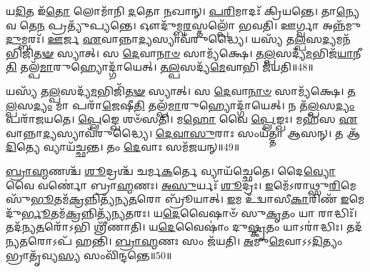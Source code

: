 𑌯\-\ul{𑌦𑌿}\-𑌤 𑌇᳴\-\ul{𑌤𑍋} 𑌲𑍋𑌮𑌾᳴𑌨𑌿 \ul{𑌦}\-𑌤𑍋 \ul{𑌨}\-𑌖𑌾𑌨𑍍।
\-\ul{𑌪}\-\-\ul{𑌰𑌿}\-𑌮𑌾𑌦𑌃᳴ 𑌕𑍍𑌰𑌿𑌯𑌨𑍍𑌤𑍇।
𑌤𑌾\-\ul{𑌨𑍍𑌯𑍇}\-𑌵 𑌤𑍇\-\ul{𑌨} 𑌪𑍍𑌰𑌤𑍍𑌯𑍁᳴𑌪𑍍𑌯𑌨𑍍𑌤𑍇।
𑌔𑌦𑍁᳴𑌮𑍍𑌬\-\ul{𑌰}\-𑌸𑍍𑌤𑌲𑍍𑌪𑍋᳴ 𑌭𑌵𑌤𑌿।
𑌊𑌰𑍍𑌗𑍍𑌵𑌾 𑌅𑌨𑍍𑌨᳴𑌮𑍁\-\ul{𑌦𑍁}\-𑌮𑍍𑌬𑌰𑌃᳴।
\-\ul{𑌊}\-𑌰𑍍𑌜 \ul{𑌏}\-𑌵𑌾𑌨𑍍𑌨𑌾\-\ul{𑌦𑍍𑌯}\-𑌸𑍍𑌯𑌾𑌵᳴𑌰𑍁𑌦𑍍𑌧𑍍𑌯𑍈।
𑌯𑌸𑍍𑌯᳴ 𑌤\-\ul{𑌲𑍍𑌪}\-𑌸\-\ul{𑌦𑍍𑌯}\-𑌮𑌨᳴𑌭𑌿𑌜𑌿\-\ul{𑌤}\-\-\ul{𑍟} 𑌸𑍍𑌯𑌾𑌤𑍍।
𑌸 \ul{𑌦𑍇}\-𑌵𑌾\-\ul{𑌨𑌾}\-\-\ul{𑍞} 𑌸𑌾𑌮𑍍𑌯᳴𑌕𑍍𑌷𑍇।
\-\ul{𑌤}\-\-\ul{𑌲𑍍𑌪}\-𑌸𑌦𑍍𑌯᳴\-\ul{𑌮}\-𑌭𑌿𑌜᳴\-\ul{𑌯𑌾}\-𑌨𑍀\-\ul{𑌤𑌿} 𑌤𑌲𑍍𑌪᳴\-\ul{𑌮𑌾}\-𑌰𑍁𑌹𑍍𑌯𑍋𑌦𑍍𑌗𑌾᳴𑌯𑍇𑌤𑍍।
\-\ul{𑌤}\-\-\ul{𑌲𑍍𑌪}\-𑌸𑌦𑍍𑌯᳴\-\ul{𑌮𑍇}\-𑌵𑌾𑌭𑌿 𑌜᳴𑌯𑌤𑌿॥48॥

𑌯𑌸𑍍𑌯᳴ 𑌤\-\ul{𑌲𑍍𑌪}\-𑌸𑌦𑍍𑌯᳴\-\ul{𑌮}\-𑌭𑌿𑌜𑌿᳴\-\ul{𑌤}\-\-\ul{𑍟} 𑌸𑍍𑌯𑌾𑌤𑍍।
𑌸 \ul{𑌦𑍇}\-𑌵𑌾\-\ul{𑌨𑌾}\-\-\ul{𑍞} 𑌸𑌾𑌮𑍍𑌯᳴𑌕𑍍𑌷𑍇।
\-\ul{𑌤}\-\-\ul{𑌲𑍍𑌪}\-𑌸\-\ul{𑌦𑍍𑌯𑌂} 𑌮𑌾 𑌪𑌰𑌾᳴\-\ul{𑌜𑍇}\-𑌷𑍀\-\ul{𑌤𑌿} 𑌤𑌲𑍍𑌪᳴\-\ul{𑌮𑌾}\-𑌰𑍁𑌹𑍍𑌯𑍋𑌦𑍍𑌗𑌾᳴𑌯𑍇𑌤𑍍।
𑌨 𑌤᳴\-\ul{𑌲𑍍𑌪}\-𑌸\-\ul{𑌦𑍍𑌯𑌂} 𑌪𑌰𑌾᳴𑌜𑌯𑌤𑍇।
\-\ul{𑌪𑍍𑌲𑍇}\-𑌙𑍍𑌖𑍇 𑌶𑍞᳴𑌸𑌤𑌿।
𑌮\-\ul{𑌹𑍋} 𑌵𑍈 \ul{𑌪𑍍𑌲𑍇}\-𑌙𑍍𑌖𑌃।
𑌮𑌹᳴𑌸 \ul{𑌏}\-𑌵𑌾𑌨𑍍𑌨𑌾\-\ul{𑌦𑍍𑌯}\-𑌸𑍍𑌯𑌾𑌵᳴𑌰𑍁𑌦𑍍𑌧𑍍𑌯𑍈।
\-\ul{𑌦𑍇}\-\-\ul{𑌵𑌾}\-\-\ul{𑌸𑍁}\-𑌰𑌾𑌃 𑌸𑌂𑌯᳴𑌤𑍍𑌤𑌾 𑌆𑌸𑌨𑍍।
𑌤 𑌆᳴\-\ul{𑌦𑌿}\-𑌤𑍍𑌯𑍇 𑌵𑍍𑌯𑌾𑌯᳴𑌚𑍍𑌛𑌨𑍍𑌤।
𑌤𑌂 \ul{𑌦𑍇}\-𑌵𑌾𑌃 𑌸𑌮᳴𑌜𑌯𑌨𑍍॥49॥

\-\ul{𑌬𑍍𑌰𑌾}\-\-\ul{𑌹𑍍𑌮}\-𑌣𑌶𑍍𑌚᳴ \ul{𑌶𑍂}\-𑌦𑍍𑌰𑌶𑍍𑌚᳴ 𑌚𑌰𑍍𑌮\-\ul{𑌕}\-𑌰𑍍𑌤𑍇 𑌵𑍍𑌯𑌾𑌯᳴𑌚𑍍𑌛𑍇𑌤𑍇।
𑌦𑍈\-\ul{𑌵𑍍𑌯𑍋} 𑌵𑍈 𑌵𑌰𑍍𑌣𑍋॑ 𑌬𑍍𑌰𑌾\-\ul{𑌹𑍍𑌮}\-𑌣𑌃।
\-\ul{𑌅}\-\-\ul{𑌸𑍁}\-𑌰𑍍𑌯𑌃᳴ \ul{𑌶𑍂}\-𑌦𑍍𑌰𑌃।
\-\ul{𑌇}\-𑌮𑍇᳴\-𑌽𑌰𑌾𑌥𑍍𑌸𑍁\-\ul{𑌰𑌿}\-𑌮𑍇 𑌸𑍁᳴\-\ul{𑌭𑍂}\-𑌤𑌮᳴\-\ul{𑌕𑍍𑌰}\-𑌨𑍍𑌨𑌿𑌤𑍍𑌯᳴𑌨𑍍𑌯\-\ul{𑌤}\-𑌰𑍋 𑌬𑍍𑌰𑍂᳴𑌯𑌾𑌤𑍍।
\-\ul{𑌇}\-𑌮 𑌉᳴𑌦𑍍𑌵𑌾𑌸𑍀\-\ul{𑌕𑌾}\-𑌰𑌿𑌣᳴ \ul{𑌇}\-𑌮𑍇 𑌦𑍁᳴\-\ul{𑌰𑍍𑌭𑍂}\-𑌤𑌮᳴\-\ul{𑌕𑍍𑌰}\-𑌨𑍍𑌨𑌿𑌤𑍍𑌯᳴𑌨𑍍𑌯\-\ul{𑌤}\-𑌰𑌃।
𑌯\-\ul{𑌦𑍇}\-𑌵𑍈𑌷𑌾𑍞᳴ 𑌸𑍁\-\ul{𑌕𑍃}\-𑌤𑌂 𑌯𑌾 𑌰𑌾𑌦𑍍𑌧𑌿𑌃᳴।
𑌤𑌦᳴𑌨𑍍𑌯\-\ul{𑌤}\-𑌰𑍋᳴𑌽𑌭𑌿 𑌶𑍍𑌰𑍀᳴𑌣𑌾𑌤𑌿।
𑌯\-\ul{𑌦𑍇}\-𑌵𑍈𑌷𑌾𑌂॑ 𑌦𑍁\-\ul{𑌷𑍍𑌕𑍃}\-𑌤𑌂 𑌯𑌾𑌽𑌰𑌾॑𑌦𑍍𑌧𑌿𑌃।
𑌤𑌦᳴𑌨𑍍𑌯\-\ul{𑌤}\-𑌰𑍋𑌽𑌪᳴ 𑌹𑌨𑍍𑌤𑌿।
\-\ul{𑌬𑍍𑌰𑌾}\-\-\ul{𑌹𑍍𑌮}\-𑌣𑌃 𑌸𑌂 𑌜᳴𑌯𑌤𑌿।
\-\ul{𑌅}\-𑌮𑍁\-\ul{𑌮𑍇}\-𑌵𑌾𑌽𑌽\-\ul{𑌦𑌿}\-𑌤𑍍𑌯𑌂 𑌭𑍍𑌰𑌾𑌤𑍃᳴𑌵𑍍𑌯\-\ul{𑌸𑍍𑌯} 𑌸𑌂𑌵𑌿᳴𑌨𑍍𑌦𑌨𑍍𑌤𑍇॥50॥




\clearpage
{}
\setcounter{anuvakam}{0}

